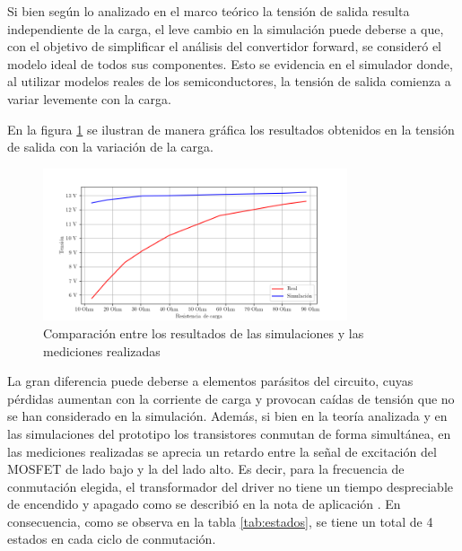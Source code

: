 
Si bien según lo analizado en el marco teórico la tensión de salida resulta independiente de la carga, el leve cambio en la simulación puede deberse a que, con el objetivo de simplificar el análisis del convertidor forward, se consideró el modelo ideal de todos sus componentes. 
Esto se evidencia en el simulador donde, al utilizar modelos reales de los semiconductores, la tensión de salida comienza a variar levemente con la carga.


En la figura \ref{fig:comparacion} se ilustran de manera gráfica los resultados obtenidos en la tensión de salida con la variación de la carga.

\begin{figure}[H]
    \centering
    \includegraphics[width=0.8\textwidth]{images/comparacion-general.png}
    \caption{Comparación entre los resultados de las simulaciones y las mediciones realizadas}
    \label{fig:comparacion}
\end{figure}

La gran diferencia puede deberse a elementos parásitos del circuito, cuyas pérdidas aumentan con la corriente de carga y provocan caídas de tensión que no se han considerado en la simulación.
Además, si bien en la teoría analizada y en las simulaciones del prototipo los transistores conmutan de forma simultánea, en las mediciones realizadas se aprecia un retardo entre la señal de excitación del MOSFET de lado bajo y la del lado alto. 
Es decir, para la frecuencia de conmutación elegida, el transformador del driver no tiene un tiempo despreciable de encendido y apagado como se describió en la nota de aplicación \cite{gatedrivers}.  
En consecuencia, como se observa en la tabla \ref{tab:estados}, se tiene un total de 4 estados en cada ciclo de conmutación.

